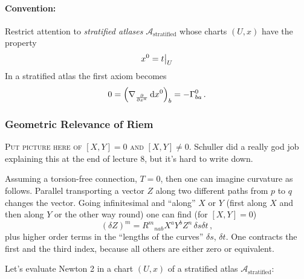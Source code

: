 \paragraph{Convention:}
Restrict attention to \textit{stratified atlases} $\mathcal{A}_\text{stratified}$
whose charts $(U,x)$ have the property
\begin{equation}
    x^0 = t\big|_U
\end{equation}
In a stratified atlas the first axiom becomes
\begin{align}
    0 = \left( \nabla_\frac{\partial}{\partial x^a} \operatorname{d\!} x^0 \right)_b = -\Gamma^0_{ba}\,.
\end{align}

\subsubsection{Geometric Relevance of Riem}
\begin{center}
    \textsc{Put picture here of $[X,Y] = 0$ and
    $[X,Y] \neq 0$}.
    Schuller did a really god job explaining this at the end of lecture
    8, but it's hard to write down.
\end{center}

Assuming a torsion-free connection, $T=0$, then one can imagine curvature as follows.
Parallel transporting a vector $Z$ along two different paths from $p$ to $q$
changes the vector.
Going infinitesimal and ``along'' $X$ or $Y$ (first along $X$ and then along $Y$ or the other
way round) one can find (for $[X,Y] = 0$)
\begin{equation}
    (\delta Z)^m = R^m{}_{nab}X^aY^bZ^n\,\delta s\delta t\,,
\end{equation}
plus higher order terms in the ``lengths of the curves'' $\delta s$, $\delta t$.
One contracts the first and the third index, because all others are either zero or equivalent.

Let's evaluate Newton 2 in a chart $(U,x)$ of a stratified atlas $\mathcal{A}_\text{stratified}$:


